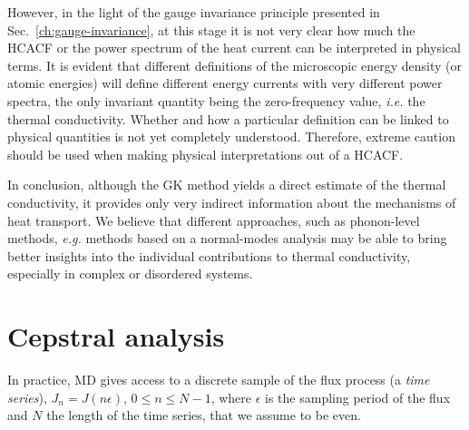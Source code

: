 \begin{LEtext}
However, in the light of the gauge invariance principle presented in Sec.~\ref{ch:gauge-invariance}, at this stage it is not very clear how much the HCACF or the power spectrum of the heat current can be interpreted in physical terms. It is evident that different definitions of the microscopic energy density (or atomic energies) will define different energy currents with very different power spectra, the only invariant quantity being the zero-frequency value, \emph{i.e.} the thermal conductivity. 
Whether and how a particular definition can be linked to physical quantities is not yet completely understood. Therefore, extreme caution should be used when making physical interpretations out of a HCACF. 

In conclusion, although the GK method yields a direct estimate of the thermal conductivity, it provides only very indirect information about the mechanisms of heat transport. We believe that different approaches, such as phonon-level methods, \emph{e.g.} methods based on a normal-modes analysis \cite{Esfarjani2011} may be able to bring better insights into the individual contributions to thermal conductivity, especially in complex or disordered systems. 

\end{LEtext}


\section{Cepstral analysis}  \label{sec:cepstral-analysis}

In practice, MD gives access to a discrete sample of the flux process (a \emph{time series}), $J_n = J(n \epsilon)$, $0 \leq n \leq N-1$, where $\epsilon$ is the sampling period of the flux and $N$ the length of the time series, that we assume to be even. 


